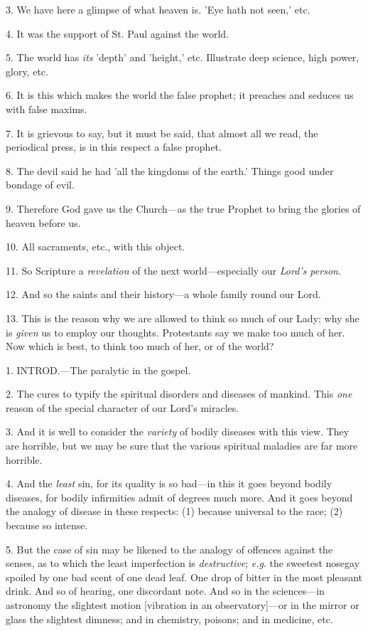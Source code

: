 3. We have here a glimpse of what heaven is. 'Eye
hath not seen,' etc.

4. It was the support of St. Paul against the
world.

5. The world has \emph{its} 'depth' and 'height,'
etc. Illustrate deep science, high power, glory, etc.

6. It is this which makes the world the false
prophet; it preaches and seduces us with false maxims.

7. It is grievous to say, but it must be said,
that almost all we read, the periodical press, is in this respect a
false prophet.

8. The devil said he had 'all the kingdoms of the
earth.' Things good under bondage of evil.

9. Therefore God gave us the Church—as the true
Prophet to bring the glories of heaven before us.

10. All sacraments, etc., with this object.

11. So Scripture a \emph{revelation} of the next
world—especially our \emph{Lord's person}.

12. And so the saints and their history—a whole
family round our Lord.

13. This is the reason why we are allowed to
think so much of our Lady; why she is \emph{given} us to employ our
thoughts. Protestants say we make too much of her. Now which is best,
to think too much of her, or of the world?


1. INTROD.—The
paralytic in the gospel.

2. The cures to typify the spiritual disorders
and diseases of mankind. This \emph{one} reason of the special
character of our Lord's miracles.

3. And it is well to consider the \emph{variety}
of bodily diseases with this view. They are horrible, but we may be
sure that the various spiritual maladies are far more horrible.

4. And the \emph{least} sin, for its quality is
so bad—in this it goes beyond bodily diseases, for bodily
infirmities admit of degrees much more. And it goes beyond the analogy
of disease in these respects: (1) because universal to the race; (2)
because so intense.

5. But the case of sin may be likened to the
analogy of offences against the senses, as to which the least
imperfection is \emph{destructive}; \emph{e.g}. the sweetest nosegay
spoiled by one bad scent of one dead leaf. One drop of bitter in the
most pleasant drink. And so of hearing, one discordant note. And so in
the sciences—in astronomy the slightest motion [vibration in
an observatory]—or in the mirror or glass the slightest dimness; and
in chemistry, poisons; and in medicine, etc.

